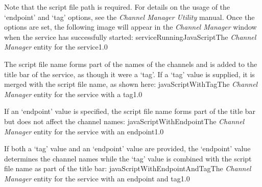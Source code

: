 Note that the script file path is required.
For details on the usage of the `endpoint' and `tag' options, see the \emph{Channel
Manager Utility} manual.
Once the options are set, the following image will appear in the \emph{Channel Manager}
window when the service has successfully started:
%
{serviceRunningJavaScript}{The \emph{Channel Manager} entity for the \JSIO{} service}{1.0}

The script file name forms part of the names of the channels and is added to the title bar
of the service, as though it were a `tag'.
\condPage{}
If a `tag' value is supplied, it is merged with the script file name, as shown here:
%
{javaScriptWithTag}{The \emph{Channel Manager} entity for the \JSIO{} service with a tag}{1.0}

If an `endpoint' value is specified, the script file name forms part of the title bar but
does not affect the channel names:
%
{javaScriptWithEndpoint}{The \emph{Channel Manager} entity for the \JSIO{} service with an
endpoint}{1.0}

If both a `tag' value and an `endpoint' value are provided, the `endpoint' value
determines the channel names while the `tag' value is combined with the script file name
as part of the title bar:
%
{javaScriptWithEndpointAndTag}{The \emph{Channel Manager} entity for the \JSIO{} service
with an endpoint and tag}{1.0}
\secondaryEnd
\primaryEnd{}
